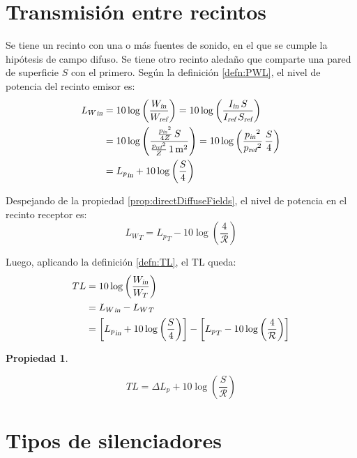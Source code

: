 \documentclass[a5paper,12pt,twoside]{book}
\newtheorem{prop}{{Propiedad}}[chapter]
\begin{document}
\section{Transmisión entre recintos}

Se tiene un recinto con una o más fuentes de sonido, en el que se cumple la hipótesis de campo difuso.
Se tiene otro recinto aledaño que comparte una pared de superficie $S$ con el primero.
Según la definición \ref{defn:PWL}, el nivel de potencia del recinto emisor es:
\begin{align*}
    {{L_W}_\textsl{{in}}}
    &= 10 \log \left( \frac{{{W}_\textsl{{in}}}}{{{W}_\textsl{{ref}}}} \right)
    = 10 \log \left( \frac{ {{I}_\textsl{{in}}} \, S }{ {{I}_\textsl{{ref}}} \, {{S}_\textsl{{ref}}} } \right)
    \\
    &= 10 \log \left( \frac{ \frac{{{p}_\textsl{{in}}}^2}{4Z} \, S }{ \frac{{{p}_\textsl{{ref}}}^2}{Z} \, 1\,\si{\metre^2} } \right)
    = 10 \log \left( \frac{{{p}_\textsl{{in}}}^2}{{{p}_\textsl{{ref}}}^2} \,  \frac{S}{4} \right)
    \\
    &= {{L_p}_\textsl{{in}}} + 10 \log \left( \frac{S}{4} \right)
\end{align*}

Despejando de la propiedad \ref{prop:directDiffuseFields}, el nivel de potencia en el recinto receptor es:
\begin{equation*}
    {L_W}_T = {L_p}_T - 10 \log \left( \frac{4}{\mathcal{R}} \right)
\end{equation*}

Luego, aplicando la definición \ref{defn:TL}, el TL queda:
\begin{align*}
    TL &=
    10 \log \left( \frac{{{W}_\textsl{{in}}}}{W_T} \right)
    \\
    &= {{L_W}_\textsl{{in}}} - {L_W}_T
    \\
    &= \left[ {{L_p}_\textsl{{in}}} + 10 \log \left( \frac{S}{4} \right) \right] - \left[ {L_p}_T - 10 \log \left( \frac{4}{\mathcal{R}} \right) \right]
\end{align*}

\begin{mdframed}[style=MyFrame1]
    \begin{prop}
    \end{prop}
    \begin{equation*}
        TL = \Delta L_p + 10 \log \left( \frac{S}{\mathcal{R}} \right)
    \end{equation*}
\end{mdframed}


\section{Tipos de silenciadores}
\end{document}
